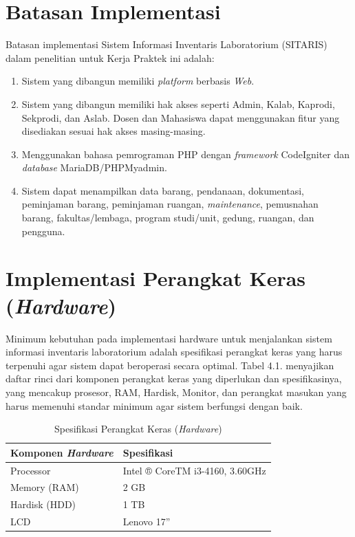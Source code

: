 \section{Batasan Implementasi}
Batasan implementasi Sistem Informasi Inventaris Laboratorium (SITARIS) dalam penelitian untuk Kerja Praktek ini adalah:
\begin{enumerate}
  \item Sistem yang dibangun memiliki \textit{platform} berbasis\textit{ Web}.
  \item Sistem yang dibangun memiliki hak akses seperti Admin, Kalab, Kaprodi, Sekprodi, dan Aslab. Dosen dan Mahasiswa dapat menggunakan fitur yang disediakan sesuai hak akses masing-masing.
  \item Menggunakan bahasa pemrograman PHP dengan \textit{framework} CodeIgniter dan \textit{database} MariaDB/PHPMyadmin.
  \item Sistem dapat menampilkan data barang, pendanaan, dokumentasi, peminjaman barang, peminjaman ruangan, \textit{maintenance}, pemusnahan barang, fakultas/lembaga, program studi/unit, gedung, ruangan, dan pengguna.
\end{enumerate}
\section{Implementasi Perangkat Keras (\textit{Hardware})}

Minimum kebutuhan pada implementasi hardware untuk menjalankan sistem informasi inventaris laboratorium adalah spesifikasi perangkat keras yang harus terpenuhi agar sistem dapat beroperasi secara optimal. Tabel 4.1. menyajikan daftar rinci dari komponen perangkat keras yang diperlukan dan spesifikasinya, yang mencakup prosesor, RAM, Hardisk, Monitor, dan perangkat masukan yang harus memenuhi standar minimum agar sistem berfungsi dengan baik.

\begin{table}[h]
  \centering
  \caption{Spesifikasi Perangkat Keras (\textit{Hardware})}
  \begin{tabular}{|l|l|}
    \hline
    \textbf{Komponen \textit{Hardware}} & \textbf{Spesifikasi}            \\ \hline
    Processor                           & Intel ® CoreTM i3-4160, 3.60GHz \\ \hline
    Memory (RAM)                        & 2 GB                            \\ \hline
    Hardisk (HDD)                       & 1 TB                            \\ \hline
    LCD                                 & Lenovo 17”                      \\ \hline
  \end{tabular}
\end{table}

